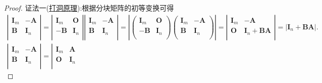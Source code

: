 \documentclass[lang=cn,newtx,10pt,scheme=chinese]{elegantbook}
\begin{document}
\begin{proof}
{\color{blue}证法一(\hyperref[proposition:打洞原理]{打洞原理}):}根据分块矩阵的初等变换可得\begin{align*}
    \left| \begin{matrix}
        \boldsymbol{I}_m&		-\boldsymbol{A}\\
        \boldsymbol{B}&		\boldsymbol{I}_n\\
    \end{matrix} \right|=\left| \begin{matrix}
        \boldsymbol{I}_m&		\boldsymbol{O}\\
        -\boldsymbol{B}&		\boldsymbol{I}_n\\
    \end{matrix} \right|\left| \begin{matrix}
        \boldsymbol{I}_m&		-\boldsymbol{A}\\
        \boldsymbol{B}&		\boldsymbol{I}_n\\
    \end{matrix} \right|=\left| \left( \begin{matrix}
        \boldsymbol{I}_m&		\boldsymbol{O}\\
        -\boldsymbol{B}&		\boldsymbol{I}_n\\
    \end{matrix} \right) \left( \begin{matrix}
        \boldsymbol{I}_m&		-\boldsymbol{A}\\
        \boldsymbol{B}&		\boldsymbol{I}_n\\
    \end{matrix} \right) \right|=\left| \begin{matrix}
        \boldsymbol{I}_m&		-\boldsymbol{A}\\
        \boldsymbol{O}&		\boldsymbol{I}_n+\boldsymbol{BA}\\
    \end{matrix} \right|=\left| \boldsymbol{I}_n+\boldsymbol{BA} \right|.
    \\
    \left| \begin{matrix}
        \boldsymbol{I}_m&		-\boldsymbol{A}\\
        \boldsymbol{B}&		\boldsymbol{I}_n\\
    \end{matrix} \right|=\left| \begin{matrix}
        \boldsymbol{I}_m&		\boldsymbol{A}\\
        \boldsymbol{O}&		\boldsymbol{I}_n\\

\end{matrix}
\end{align*}
\end{proof}
\end{document}
